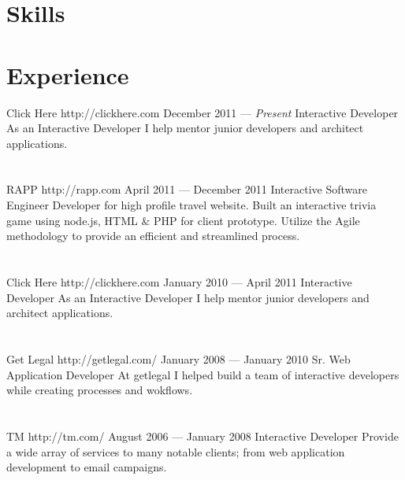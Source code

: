 \documentclass{resume}
\begin{document}

\smallskip

\section{Skills}


\section{Experience}

\employer
	{Click Here}
	{http://clickhere.com}
	{December 2011 --- \emph{Present}}
	{Interactive Developer}
	{As an Interactive Developer I help mentor junior developers and architect applications.}
\\ \\ \\
\employer
	{RAPP}
	{http://rapp.com}
	{April 2011 --- December 2011}
	{Interactive Software Engineer}
	{Developer for high profile travel website. Built an interactive trivia game using node.js, HTML \& PHP for client prototype. Utilize the Agile methodology to provide an efficient and streamlined process.}
\\ \\ \\
\employer
	{Click Here}
	{http://clickhere.com}
	{January 2010 --- April 2011}
	{Interactive Developer}
	{As an Interactive Developer I help mentor junior developers and architect applications.}
\\ \\ \\
\employer
	{Get Legal}
	{http://getlegal.com/}
	{January 2008 --- January 2010}
	{Sr. Web Application Developer}
	{At getlegal I helped build a team of interactive developers while creating processes and wokflows.}
\\ \\ \\
\employer
	{TM}
	{http://tm.com/}
	{August 2006 --- January 2008}
	{Interactive Developer}
	{Provide a wide array of services to many notable clients; from web application development to email campaigns.}
\end{document}
